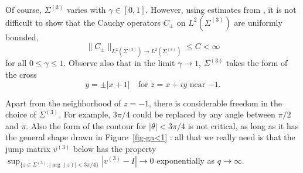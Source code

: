 \documentclass{amsart}
\theoremstyle{definition}
\theoremstyle{remark}
\numberwithin{equation}{section}
\begin{document}
Of course, $\Sigma^{(3)}$ varies with $\gamma\in [0,1]$. 
However, using estimates from \cite{GK}, it is not difficult to 
show that the Cauchy operators $C_\pm$ on $L^2(\Sigma^{(3)})$ 
are uniformly bounded, 
\begin{equation}\label{e-Cau}
   \|C_\pm \|_{L^2(\Sigma^{(3)})\to L^2(\Sigma^{(3)})} \le C <\infty
\end{equation}
for all $0\le\gamma\le 1$.
Observe also that in the limit $\gamma\to 1$, $\Sigma^{(3)}$ takes the 
form of the cross 
\begin{equation}\label{e-z10}
  y=\pm |x+1| \quad \text{for $z=x+iy$ near $-1$}.
\end{equation}

Apart from the neighborhood of $z=-1$, there is considerable freedom 
in the choice of $\Sigma^{(3)}$. 
For example, $3\pi/4$ could be replaced by any angle between 
$\pi/2$ and $\pi$. 
Also the form of the contour for $|\theta|<3\pi/4$ is not critical, 
as long as it has the general shape drawn in Figure~\ref{fig-ga<1} : 
all that we really need is that the jump matrix $v^{(3)}$ below 
has the property $\sup_{\{z\in\Sigma^{(3)} : |\arg(z)|<3\pi/4\}} 
|v^{(3)}-I|\to 0$ 
exponentially as $q\to\infty$.
\end{document}
